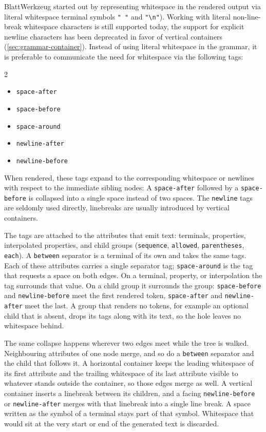 \documentclass[]{report}
\begin{document}
Blatt\-Werkzeug started out by representing whitespace in the rendered output via literal whitespace terminal symbols \texttt{"~"} and \texttt{"\textbackslash n"}). Working with literal non-line-break whitespace characters is still supported today, the support for explicit newline characters has been deprecated in favor of vertical containers (\cref{sec:grammar-container}). Instead of using literal whitespace in the grammar, it is preferable to communicate the need for whitespace via the following tags:

\begin{multicols}{2}
\begin{itemize}
\item \texttt{space-after}
\item \texttt{space-before}
\item \texttt{space-around}
\item \texttt{newline-after}
\item \texttt{newline-before}
\end{itemize}
\end{multicols}

When rendered, these tags expand to the corresponding whitespace or newlines with respect to the immediate sibling nodes: A \texttt{space-after} followed by a \texttt{space-before} is collapsed into a single space instead of two spaces. The \texttt{newline} tags are seldomly used directly, linebreaks are usually introduced by vertical containers.

The tags are attached to the attributes that emit text: terminals, properties, interpolated properties, and child groups (\texttt{sequence}, \texttt{allowed}, \texttt{parentheses}, \texttt{each}). A \texttt{between} separator is a terminal of its own and takes the same tags. Each of these attributes carries a single separator tag; \texttt{space-around} is the tag that requests a space on both edges. On a terminal, property, or interpolation the tag surrounds that value. On a child group it surrounds the group: \texttt{space-before} and \texttt{newline-before} meet the first rendered token, \texttt{space-after} and \texttt{newline-after} meet the last. A group that renders no tokens, for example an optional child that is absent, drops its tags along with its text, so the hole leaves no whitespace behind.

The same collapse happens wherever two edges meet while the tree is walked. Neighbouring attributes of one node merge, and so do a \texttt{between} separator and the child that follows it. A horizontal container keeps the leading whitespace of its first attribute and the trailing whitespace of its last attribute visible to whatever stands outside the container, so those edges merge as well. A vertical container inserts a linebreak between its children, and a facing \texttt{newline-before} or \texttt{newline-after} merges with that linebreak into a single line break. A space written as the symbol of a terminal stays part of that symbol. Whitespace that would sit at the very start or end of the generated text is discarded.
\end{document}
